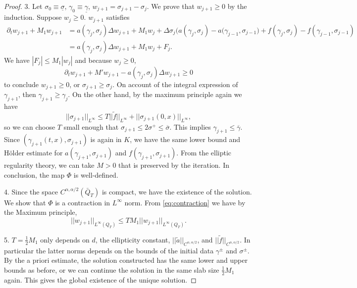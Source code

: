 \documentclass[a4paper,11pt]{article}
\theoremstyle{remark}
\begin{document}
\begin{proof}
3.  Let $\sigma_0 \equiv \underline\sigma$, $\gamma_0\equiv \underline\gamma$, $w_{j+1}=\sigma_{j+1} - \sigma_j$. We prove that $w_{j+1}\ge0$ by the induction. Suppose $w_j\ge0$. $w_{j+1}$ satisfies
\begin{equation}
\begin{aligned}
\partial_t w_{j+1} + M_1w_{j+1} &= a(\gamma_j,\sigma_j)\Delta w_{j+1} + M_1w_j + \Delta \sigma_j\big( a(\gamma_j,\sigma_j)-a(\gamma_{j-1},\sigma_{j-1}\big) + f(\gamma_j,\sigma_j)-f(\gamma_{j-1},\sigma_{j-1})\\
&=a(\gamma_j,\sigma_j)\Delta w_{j+1} + M_1w_j + F_j.
\end{aligned}\label{eq:contraction}
\end{equation}
We have $|F_j| \le M_1|w_j|$ and because $w_j\ge0$, 
$$\partial_t w_{j+1} + M'w_{j+1} - a(\gamma_j,\sigma_j)\Delta w_{j+1} \ge 0$$
to conclude $w_{j+1} \ge 0$, or $\sigma_{j+1} \ge \sigma_{j}$. On account of the integral expression of $\gamma_{j+1}$, then $\gamma_{j+1}\ge \gamma_{j}$. On the other hand, by the maximum principle again we have
$$||\sigma_{j+1}||_{L^\infty} \le T ||\tilde f||_{L^\infty}+ ||\sigma_{j+1}(0,x)||_{L^\infty},$$
so we can choose $T$ small enough that $\sigma_{j+1} \le 2\sigma^+ \le \overline{\sigma}.$ This implies $\gamma_{j+1}\le \overline{\gamma}$. Since $(\gamma_{j+1}(t,x),\sigma_{j+1})$ is again in $K$, we have the same lower bound and H\"older estimate for $a(\gamma_{j+1},\sigma_{j+1})$ and $f(\gamma_{j+1},\sigma_{j+1})$. From the elliptic regularity theory, we can take $M>0$ that is preserved by the iteration. In conclusion, the map $\Phi$ is well-defined.

4. Since the space $C^{\alpha,\alpha/2}(\bar{Q}_T)$ is compact, we have the existence of the solution. We show that $\Phi$ is a contraction in $L^\infty$ norm. From \eqref{eq:contraction} we have by the Maximum principle,
$$||w_{j+1}||_{L^\infty(Q_T)} \le T M_1||w_{j+1}||_{L^\infty(Q_T)}.$$

5. $T= \frac{1}{2} M_1$ only depends on $d$, the ellipticity constant, $||\tilde a||_{C^{\alpha,\alpha/2}}$, and $||\tilde f||_{C^{\alpha,\alpha/2}}$. In particular the latter norms depends on the bounds of the initial data $\gamma^\pm$ and $\sigma^\pm$. By the a priori estimate, the solution constructed has the same lower and upper bounds as before, or we can continue the solution in the same slab size $\frac{1}{2} M_1$ again. This gives the global existence of the unique solution.
\end{proof}
\end{document}
